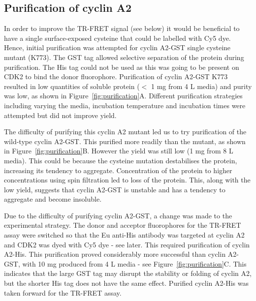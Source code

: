 \subsection{Purification of cyclin A2}

In order to improve the TR-FRET signal (see below) it would be beneficial to have a single surface-exposed cysteine that could be labelled with Cy5 dye.
Hence, initial purification was attempted for cyclin A2-GST single cysteine mutant (K773).
The GST tag allowed selective separation of the protein during purification.
The His tag could not be used as this was going to be present on CDK2 to bind the donor fluorophore.
Purification of cyclin A2-GST K773 resulted in low quantities of soluble protein ($<$ 1 mg from 4 L media) and purity was low, as shown in Figure~\ref{fig:purification}A.
Different purification strategies including varying the media, incubation temperature and incubation times were attempted but did not improve yield.

The difficulty of purifying this cyclin A2 mutant led us to try purification of the wild-type cyclin A2-GST.
This purified more readily than the mutant, as shown in Figure~\ref{fig:purification}B.
However the yield was still low (1 mg from 8 L media).
This could be because the cysteine mutation destabilises the protein, increasing its tendency to aggregate.
Concentration of the protein to higher concentrations using spin filtration led to loss of the protein.
This, along with the low yield, suggests that cyclin A2-GST is unstable and has a tendency to aggregate and become insoluble.

Due to the difficulty of purifying cyclin A2-GST, a change was made to the experimental strategy.
The donor and acceptor fluorophores for the TR-FRET assay were switched so that the Eu anti-His antibody was targeted at cyclin A2 and CDK2 was dyed with Cy5 dye - see later.
This required purification of cyclin A2-His.
This purification proved considerably more successful than cyclin A2-GST, with 10 mg produced from 4 L media - see Figure~\ref{fig:purification}C.
This indicates that the large GST tag may disrupt the stability or folding of cyclin A2, but the shorter His tag does not have the same effect.
Purified cyclin A2-His was taken forward for the TR-FRET assay.



